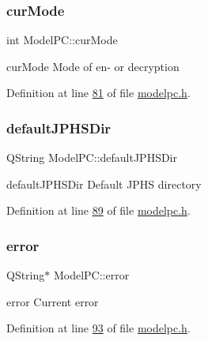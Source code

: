 \subsubsection{\texorpdfstring{cur\+Mode}{curMode}}
{\footnotesize\ttfamily int Model\+P\+C\+::cur\+Mode}



cur\+Mode Mode of en-\/ or decryption 



Definition at line \mbox{\hyperlink{modelpc_8h_source_l00081}{81}} of file \mbox{\hyperlink{modelpc_8h_source}{modelpc.\+h}}.

\mbox{\label{class_model_p_c_abd038306f14f22fb885a1697c96d6335}} 
\subsubsection{\texorpdfstring{default\+J\+P\+H\+S\+Dir}{defaultJPHSDir}}
{\footnotesize\ttfamily Q\+String Model\+P\+C\+::default\+J\+P\+H\+S\+Dir}



default\+J\+P\+H\+S\+Dir Default J\+P\+HS directory 



Definition at line \mbox{\hyperlink{modelpc_8h_source_l00089}{89}} of file \mbox{\hyperlink{modelpc_8h_source}{modelpc.\+h}}.

\mbox{\label{class_model_p_c_a4e5a9c0ca1f06fe5bc478b6bf248c37c}} 
\subsubsection{\texorpdfstring{error}{error}}
{\footnotesize\ttfamily Q\+String$\ast$ Model\+P\+C\+::error}



error Current error 



Definition at line \mbox{\hyperlink{modelpc_8h_source_l00093}{93}} of file \mbox{\hyperlink{modelpc_8h_source}{modelpc.\+h}}.

\mbox{\label{class_model_p_c_a945ffbbc44a832b953c191debd448f4c}} 
